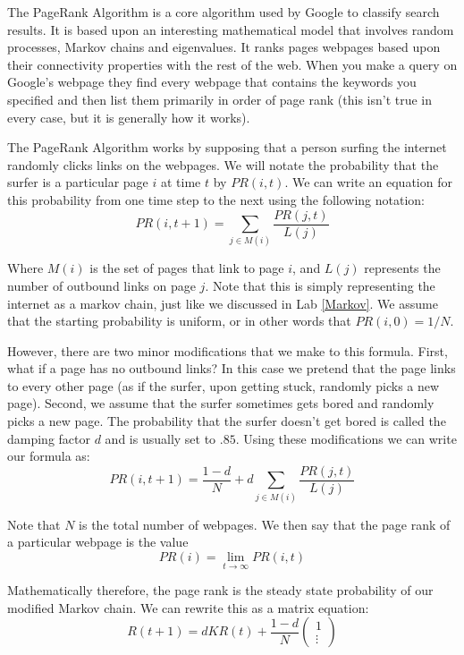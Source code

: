 \label{lab:page_rank}


The PageRank Algorithm is a core algorithm used by Google to classify search results.
It is based upon an interesting mathematical model that involves random processes, Markov chains and eigenvalues.
It ranks pages webpages based upon their connectivity properties with the rest of the web.
When you make a query on Google's webpage they find every webpage that contains the keywords you specified and then list them primarily in order of page rank (this isn't true in every case, but it is generally how it works).

The PageRank Algorithm works by supposing that a person surfing the internet randomly clicks links on the webpages.
We will notate the probability that the surfer is a particular page $i$ at time $t$ by $PR(i,t)$.
We can write an equation for this probability from one time step to the next using the following notation:
\[
PR(i,t+1) = \sum_{j \in M(i)} \frac{PR(j,t)}{L(j)}
\]

Where $M(i)$ is the set of pages that link to page $i$, and $L(j)$ represents the number of outbound links on page $j$.
Note that this is simply representing the internet as a markov chain, just like we discussed in Lab \ref{Markov}.
We assume that the starting probability is uniform, or in other words that $PR(i,0) = 1/N$.

However, there are two minor modifications that we make to this formula.
First, what if a page has no outbound links?
In this case we pretend that the page links to every other page (as if the surfer, upon getting stuck, randomly picks a new page).
Second, we assume that the surfer sometimes gets bored and randomly picks a new page.
The probability that the surfer doesn't get bored is called the damping factor $d$ and is usually set to $.85$.
Using these modifications we can write our formula as:
\[
PR(i,t+1) = \frac{1-d}{N} + d\sum_{j \in M(i)} \frac{PR(j,t)}{L(j)}
\]

Note that $N$ is the total number of webpages.
We then say that the page rank of a particular webpage is the value
\[
PR(i) = \lim_{t\to \infty} PR(i,t)
\]

Mathematically therefore, the page rank is the steady state probability of our modified Markov chain.
We can rewrite this as a matrix equation:
\[
R(t+1) = d K R(t) + \frac{1-d}{N} \begin{pmatrix}1\\\vdots\end{pmatrix}
\]

